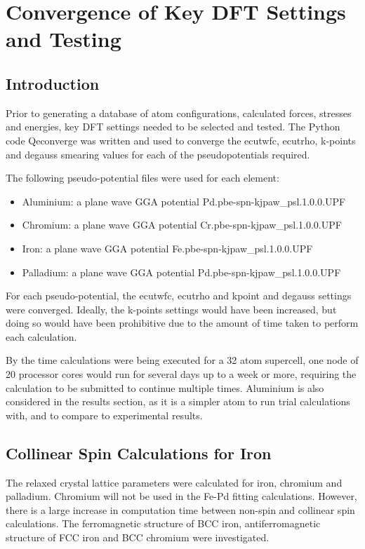 \section{Convergence of Key DFT Settings and Testing}

\subsection{Introduction}

Prior to generating a database of atom configurations, calculated forces, stresses and energies, key DFT settings needed to be selected and tested.  The Python code Qeconverge was written and used to converge the ecutwfc, ecutrho, k-points and degauss smearing values for each of the pseudopotentials required.  

The following pseudo-potential files were used for each element:



\begin{itemize}
\item Aluminium: a plane wave GGA potential Pd.pbe-spn-kjpaw\_psl.1.0.0.UPF
\item Chromium: a plane wave GGA potential Cr.pbe-spn-kjpaw\_psl.1.0.0.UPF
\item Iron: a plane wave GGA potential Fe.pbe-spn-kjpaw\_psl.1.0.0.UPF 
\item Palladium: a plane wave GGA potential Pd.pbe-spn-kjpaw\_psl.1.0.0.UPF
\end{itemize}


For each pseudo-potential, the ecutwfc, ecutrho and kpoint and degauss settings were converged.  Ideally, the k-points settings would have been increased, but doing so would have been prohibitive due to the amount of time taken to perform each calculation.

By the time calculations were being executed for a 32 atom supercell, one node of 20 processor cores would run for several days up to a week or more, requiring the calculation to be submitted to continue multiple times.  Aluminium is also considered in the results section, as it is a simpler atom to run trial calculations with, and to compare to experimental results.



\subsection{Collinear Spin Calculations for Iron}

The relaxed crystal lattice parameters were calculated for iron, chromium and palladium.  Chromium will not be used in the Fe-Pd fitting calculations.  However, there is a large increase in computation time between non-spin and collinear spin calculations.  The ferromagnetic structure of BCC iron, antiferromagnetic structure of FCC iron and BCC chromium were investigated.

